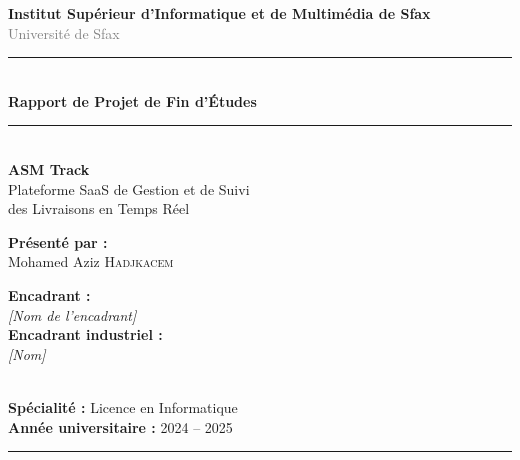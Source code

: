 \begin{titlepage}
\begin{center}


{\Large\bfseries Institut Supérieur d'Informatique et de Multimédia de Sfax}\\[0.3cm]
{\large\textcolor{gray}{Université de Sfax}}\\[1.5cm]

\rule{\linewidth}{1.5pt}\\[0.4cm]
{\LARGE\bfseries\color{primary} Rapport de Projet de Fin d'Études}\\[0.2cm]
\rule{\linewidth}{1.5pt}\\[1.5cm]

{\huge\bfseries ASM Track}\\[0.4cm]
{\Large\color{accent} Plateforme SaaS de Gestion et de Suivi\\[0.2cm]
des Livraisons en Temps Réel}\\[2cm]

\begin{minipage}{0.45\textwidth}
  \begin{flushleft}
    \textbf{Présenté par :}\\[0.2cm]
    Mohamed Aziz \textsc{Hadjkacem}\\
  \end{flushleft}
\end{minipage}
\hfill
\begin{minipage}{0.45\textwidth}
  \begin{flushright}
    \textbf{Encadrant :}\\[0.2cm]
    \textit{[Nom de l'encadrant]}\\[0.5cm]
    \textbf{Encadrant industriel :}\\[0.2cm]
    \textit{[Nom]}\\
  \end{flushright}
\end{minipage}\\[2cm]

\textbf{Spécialité :} Licence en Informatique\\[0.3cm]
\textbf{Année universitaire :} 2024 -- 2025

\vfill
\rule{\linewidth}{0.5pt}

\end{center}
\end{titlepage}

